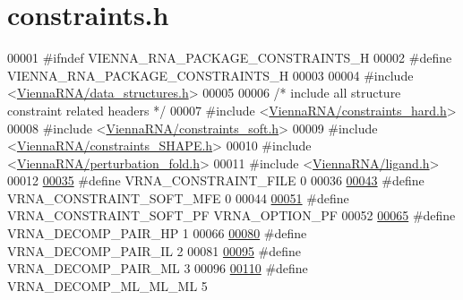 \hypertarget{constraints_8h_source}{}\section{constraints.\+h}
\label{constraints_8h_source}

\begin{DoxyCode}
00001 \textcolor{preprocessor}{#ifndef VIENNA\_RNA\_PACKAGE\_CONSTRAINTS\_H}
00002 \textcolor{preprocessor}{#define VIENNA\_RNA\_PACKAGE\_CONSTRAINTS\_H}
00003 
00004 \textcolor{preprocessor}{#include <\hyperlink{data__structures_8h}{ViennaRNA/data\_structures.h}>}
00005 
00006 \textcolor{comment}{/* include all structure constraint related headers */}
00007 \textcolor{preprocessor}{#include <\hyperlink{constraints__hard_8h}{ViennaRNA/constraints\_hard.h}>}
00008 \textcolor{preprocessor}{#include <\hyperlink{constraints__soft_8h}{ViennaRNA/constraints\_soft.h}>}
00009 \textcolor{preprocessor}{#include <\hyperlink{constraints__SHAPE_8h}{ViennaRNA/constraints\_SHAPE.h}>}
00010 \textcolor{preprocessor}{#include <\hyperlink{perturbation__fold_8h}{ViennaRNA/perturbation\_fold.h}>}
00011 \textcolor{preprocessor}{#include <\hyperlink{ligand_8h}{ViennaRNA/ligand.h}>}
00012 
\hypertarget{constraints_8h_source_l00035}{}\hyperlink{group__constraints_ga62e0ed0c33002c09423de4e646f85a2b}{00035} \textcolor{preprocessor}{#define VRNA\_CONSTRAINT\_FILE      0}
00036 
\hypertarget{constraints_8h_source_l00043}{}\hyperlink{group__constraints_ga62aa195893d02d1a79ca94952748df36}{00043} \textcolor{preprocessor}{#define VRNA\_CONSTRAINT\_SOFT\_MFE  0}
00044 
\hypertarget{constraints_8h_source_l00051}{}\hyperlink{group__constraints_ga03fb5000c19b9a2082bf4ea30a543045}{00051} \textcolor{preprocessor}{#define VRNA\_CONSTRAINT\_SOFT\_PF   VRNA\_OPTION\_PF}
00052 
\hypertarget{constraints_8h_source_l00065}{}\hyperlink{group__constraints_ga8bd41ebc8039378d242e4e8c273716a5}{00065} \textcolor{preprocessor}{#define VRNA\_DECOMP\_PAIR\_HP     1}
00066 
\hypertarget{constraints_8h_source_l00080}{}\hyperlink{group__constraints_gaeab04f34d7730cff2d651d782f95d857}{00080} \textcolor{preprocessor}{#define VRNA\_DECOMP\_PAIR\_IL     2}
00081 
\hypertarget{constraints_8h_source_l00095}{}\hyperlink{group__constraints_gaa15b1185673f0b9e900c4748d45f388f}{00095} \textcolor{preprocessor}{#define VRNA\_DECOMP\_PAIR\_ML     3}
00096 
\hypertarget{constraints_8h_source_l00110}{}\hyperlink{group__constraints_ga735517266f2e35e1374b8f1ea77ef23e}{00110} \textcolor{preprocessor}{#define VRNA\_DECOMP\_ML\_ML\_ML    5}

\end{DoxyCode}
